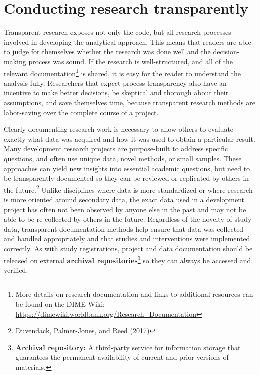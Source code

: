 \documentclass[
]{book}
\begin{document}
\hypertarget{conducting-research-transparently}{%
\section*{Conducting research transparently}\label{conducting-research-transparently}}

Transparent research exposes not only the code,
but all research processes involved in developing the analytical approach.
This means that readers are able to judge for themselves whether the research was done well
and the decision-making process was sound.
If the research is well-structured, and all of the relevant documentation\footnote{More details on research documentation and
  links to additional resources can be found on the DIME Wiki:
  \url{https://dimewiki.worldbank.org/Research_Documentation}}
is shared, it is easy for the reader to understand the analysis fully.
Researchers that expect process transparency also have an incentive to make better decisions,
be skeptical and thorough about their assumptions,
and save themselves time,
because transparent research methods are labor-saving over the complete course of a project.

Clearly documenting research work is necessary
to allow others to evaluate exactly what data was acquired and how it was used
to obtain a particular result.
Many development research projects are purpose-built
to address specific questions,
and often use unique data, novel methods, or small samples.
These approaches can yield new insights into essential academic questions,
but need to be transparently documented so they can be reviewed
or replicated by others in the future.\footnote{Duvendack, Palmer-Jones, and Reed (\protect\hyperlink{ref-duvendack2017meant}{2017})}
Unlike disciplines where data is more standardized
or where research is more oriented around secondary data,
the exact data used in a development project
has often not been observed by anyone else in the past
and may not be able to be re-collected by others in the future.
Regardless of the novelty of study data,
transparent documentation methods help ensure
that data was collected and handled appropriately
and that studies and interventions were implemented correctly.
As with study registrations, project and data documentation
should be released on external \textbf{archival repositories}\footnote{\textbf{Archival repository:} A third-party service for information storage
  that guarantees the permanent availability of current and prior versions of materials.}
so they can always be accessed and verified.
\end{document}
